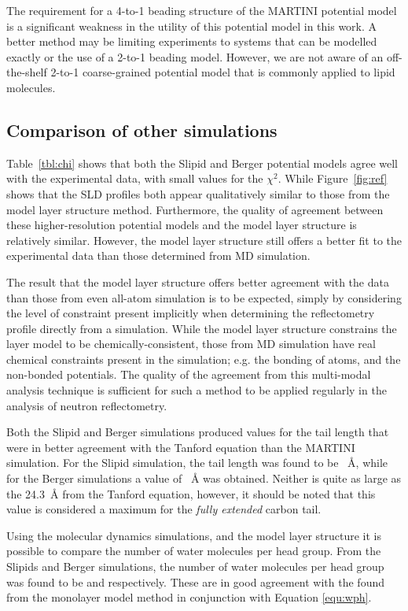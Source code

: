 \documentclass[amsmath,amssymb,twocolumn,superscriptaddress]{revtex4-1}
\begin{document}
The requirement for a 4-to-1 beading structure of the MARTINI potential model is a significant weakness in the utility of this potential model in this work.
A better method may be limiting experiments to systems that can be modelled exactly or the use of a 2-to-1 beading model.
However, we are not aware of an off-the-shelf 2-to-1 coarse-grained potential model that is commonly applied to lipid molecules.

\subsection{Comparison of other simulations}
Table~\ref{tbl:chi} shows that both the Slipid and Berger potential models agree well with the experimental data, with small values for the $\chi^2$.
While Figure~\ref{fig:ref} shows that the SLD profiles both appear qualitatively similar to those from the model layer structure method.
Furthermore, the quality of agreement between these higher-resolution potential models and the model layer structure is relatively similar.
However, the model layer structure still offers a better fit to the experimental data than those determined from MD simulation.

The result that the model layer structure offers better agreement with the data than those from even all-atom simulation is to be expected, simply by considering the level of constraint present implicitly when determining the reflectometry profile directly from a simulation.
While the model layer structure constrains the layer model to be chemically-consistent, those from MD simulation have real chemical constraints present in the simulation; e.g. the bonding of atoms, and the non-bonded potentials.
The quality of the agreement from this multi-modal analysis technique is sufficient for such a method to be applied regularly in the analysis of neutron reflectometry.

Both the Slipid and Berger simulations produced values for the tail length that were in better agreement with the Tanford equation than the MARTINI simulation.
For the Slipid simulation, the tail length was found to be ~\si{\angstrom}, while for the Berger simulations a value of ~\si{\angstrom} was obtained.
Neither is quite as large as the \SI{24.3}{\angstrom} from the Tanford equation, however, it should be noted that this value is considered a maximum for the \emph{fully extended} carbon tail.

Using the molecular dynamics simulations, and the model layer structure it is possible to compare the number of water molecules per head group.
From the Slipids and Berger simulations, the number of water molecules per head group was found to be  and  respectively.
These are in good agreement with the  found from the monolayer model method in conjunction with Equation \ref{equ:wph}.
\end{document}
